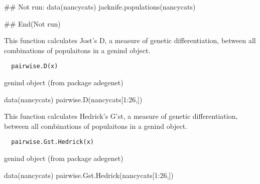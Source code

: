 \documentclass[letterpaper]{book}
\begin{document}
%
\begin{Examples}
\begin{ExampleCode}
## Not run: 
data(nancycats)
jacknife.populations(nancycats)

## End(Not run)
\end{ExampleCode}
\end{Examples}
%
\begin{Description}\relax
This function calculates Jost's D, a measure of genetic
differentiation, between all combinations of populaitons
in a genind object.
\end{Description}
%
\begin{Usage}
\begin{verbatim}
  pairwise.D(x)
\end{verbatim}
\end{Usage}
%
\begin{Arguments}
\begin{ldescription}
\item[\code{x}] genind object (from package adegenet)
\end{ldescription}
\end{Arguments}
%
\begin{Examples}
\begin{ExampleCode}
data(nancycats)
pairwise.D(nancycats[1:26,])
\end{ExampleCode}
\end{Examples}
%
\begin{Description}\relax
This function calculates Hedrick's G'st, a measure of
genetic differentiation, between all combinations of
populaitons in a genind object.
\end{Description}
%
\begin{Usage}
\begin{verbatim}
  pairwise.Gst.Hedrick(x)
\end{verbatim}
\end{Usage}
%
\begin{Arguments}
\begin{ldescription}
\item[\code{x}] genind object (from package adegenet)
\end{ldescription}
\end{Arguments}
%
\begin{Examples}
\begin{ExampleCode}
data(nancycats)
pairwise.Gst.Hedrick(nancycats[1:26,])
\end{ExampleCode}
\end{Examples}
\end{document}
